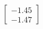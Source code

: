 \documentclass[preview]{standalone}
\begin{document}
\begin{align*}
\begin{bmatrix} -1.45 \\ -1.47 \end{bmatrix}
\end{align*}
\end{document}
